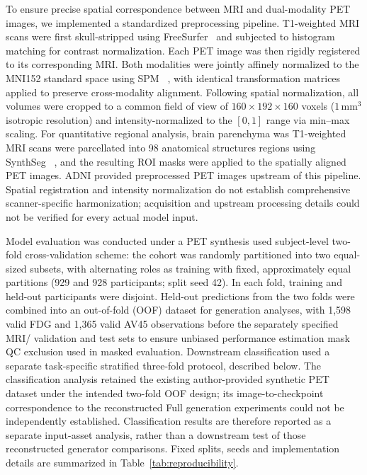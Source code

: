 \documentclass{article}
\providecommand{\DIFaddtex}[1]{{\protect\color{blue} \sf #1}} %
\providecommand{\DIFdeltex}[1]{{\protect\color{red} \scriptsize #1}} %
\providecommand{\DIFaddbegin}{} %
\providecommand{\DIFaddend}{} %
\providecommand{\DIFdelbegin}{} %
\providecommand{\DIFdelend}{} %
\providecommand{\DIFadd}[1]{\texorpdfstring{\DIFaddtex{#1}}{#1}} %
\providecommand{\DIFdel}[1]{\texorpdfstring{\DIFdeltex{#1}}{}} %
\newcommand{\DIFscaledelfig}{0.5}
\newlength{\DIFdelgraphicswidth} %
\newlength{\DIFdelgraphicsheight} %
\newcommand{\DIFaddincludegraphics}[2][]{{\color{blue}\fbox{\DIFOincludegraphics[#1]{#2}}}} %
\newcommand{\DIFdelincludegraphics}[2][]{%
\sbox{\DIFdelgraphicsbox}{\DIFOincludegraphics[#1]{#2}}%
\settoboxwidth{\DIFdelgraphicswidth}{\DIFdelgraphicsbox} %
\settoboxtotalheight{\DIFdelgraphicsheight}{\DIFdelgraphicsbox} %
\scalebox{\DIFscaledelfig}{%
\parbox[b]{\DIFdelgraphicswidth}{\usebox{\DIFdelgraphicsbox}\\[-\baselineskip] \rule{\DIFdelgraphicswidth}{0em}}\llap{\resizebox{\DIFdelgraphicswidth}{\DIFdelgraphicsheight}{%
\setlength{\unitlength}{\DIFdelgraphicswidth}%
\begin{picture}(1,1)%
\thicklines\linethickness{2pt} %
{\color[rgb]{1,0,0}\put(0,0){\framebox(1,1){}}}%
{\color[rgb]{1,0,0}\put(0,0){\line( 1,1){1}}}%
{\color[rgb]{1,0,0}\put(0,1){\line(1,-1){1}}}%
\end{picture}%
}\hspace*{3pt}}} %
} %
\DeclareRobustCommand{\DIFaddbegin}{\DIFOaddbegin \let\includegraphics\DIFaddincludegraphics} %
\DeclareRobustCommand{\DIFaddend}{\DIFOaddend \let\includegraphics\DIFOincludegraphics} %
\DeclareRobustCommand{\DIFdelbegin}{\DIFOdelbegin \let\includegraphics\DIFdelincludegraphics} %
\DeclareRobustCommand{\DIFdelend}{\DIFOaddend \let\includegraphics\DIFOincludegraphics} %
\begin{document}
To ensure precise spatial correspondence between MRI and dual-modality PET images, we implemented a standardized preprocessing pipeline. T1-weighted MRI scans were first skull-stripped using FreeSurfer~\cite{Freesurfer} and subjected to histogram matching for contrast normalization. Each PET image was then rigidly registered to its corresponding MRI. Both modalities were jointly affinely normalized to the MNI152 standard space using SPM~\DIFdelbegin \DIFdel{\cite{spm}}\DIFdelend \DIFaddbegin \DIFadd{\cite{spm,friston1995spatial}}\DIFaddend , with identical transformation matrices applied to preserve cross-modality alignment. Following spatial normalization, all volumes were cropped to a common field of view of $160 \times 192 \times 160$ voxels ($1\,\text{mm}^3$ isotropic resolution) and intensity-normalized to the $[0, 1]$ range via min–max scaling. For quantitative regional analysis, \DIFdelbegin \DIFdel{brain parenchyma was }\DIFdelend \DIFaddbegin \DIFadd{T1-weighted MRI scans were }\DIFaddend parcellated into 98 anatomical \DIFdelbegin \DIFdel{structures }\DIFdelend \DIFaddbegin \DIFadd{regions }\DIFaddend using SynthSeg~\cite{synthseg}\DIFaddbegin \DIFadd{, and the resulting ROI masks were applied to the spatially aligned PET images. ADNI provided preprocessed PET images upstream of this pipeline. Spatial registration and intensity normalization do not establish comprehensive scanner-specific harmonization; acquisition and upstream processing details could not be verified for every actual model input}\DIFaddend .

\DIFdelbegin \DIFdel{Model evaluation was conducted under a }\DIFdelend \DIFaddbegin \DIFadd{PET synthesis used subject-level }\DIFaddend two-fold cross-validation \DIFdelbegin \DIFdel{scheme: the cohort was randomly partitioned into two equal-sized subsets, with alternating roles as training}\DIFdelend \DIFaddbegin \DIFadd{with fixed, approximately equal partitions (929 and 928 participants; split seed 42). In each fold, training and held-out participants were disjoint. Held-out predictions from the two folds were combined into an out-of-fold (OOF) dataset for generation analyses, with 1,598 valid FDG and 1,365 valid AV45 observations before the separately specified MRI}\DIFaddend /\DIFdelbegin \DIFdel{validation and test sets to ensure unbiased performance estimation}\DIFdelend \DIFaddbegin \DIFadd{mask QC exclusion used in masked evaluation. Downstream classification used a separate task-specific stratified three-fold protocol, described below. The classification analysis retained the existing author-provided synthetic PET dataset under the intended two-fold OOF design; its image-to-checkpoint correspondence to the reconstructed Full generation experiments could not be independently established. Classification results are therefore reported as a separate input-asset analysis, rather than a downstream test of those reconstructed generator comparisons. Fixed splits, seeds and implementation details are summarized in Table~\ref{tab:reproducibility}}\DIFaddend .
\end{document}
